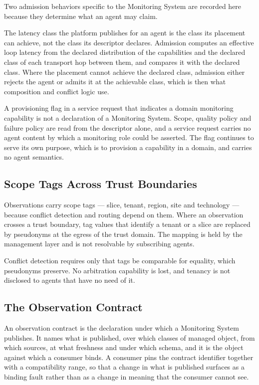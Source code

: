 Two admission behaviors specific to the Monitoring System are recorded
here because they determine what an agent may claim.

The latency class the platform publishes for an agent is the class its
placement can achieve, not the class its descriptor declares. Admission
computes an effective loop latency from the declared distribution of the
capabilities and the declared class of each transport hop between them,
and compares it with the declared class. Where the placement cannot
achieve the declared class, admission either rejects the agent or admits
it at the achievable class, which is then what composition and conflict
logic use.

A provisioning flag in a service request that indicates a domain
monitoring capability is not a declaration of a Monitoring System.
Scope, quality policy and failure policy are read from the descriptor
alone, and a service request carries no agent content by which a
monitoring role could be asserted. The flag continues to serve its own
purpose, which is to provision a capability in a domain, and carries no
agent semantics.

\hypertarget{scope-tags-across-trust-boundaries}{%
\subsection{Scope Tags Across Trust Boundaries}\label{scope-tags-across-trust-boundaries}}

Observations carry scope tags --- slice, tenant, region, site and
technology --- because conflict detection and routing depend on them.
Where an observation crosses a trust boundary, tag values that identify
a tenant or a slice are replaced by pseudonyms at the egress of the
trust domain. The mapping is held by the management layer and is not
resolvable by subscribing agents.

Conflict detection requires only that tags be comparable for equality,
which pseudonyms preserve. No arbitration capability is lost, and
tenancy is not disclosed to agents that have no need of it.

\hypertarget{the-observation-contract}{%
\subsection{The Observation Contract}\label{the-observation-contract}}

An observation contract is the declaration under which a Monitoring
System publishes. It names what is published, over which classes of
managed object, from which sources, at what freshness and under which
schema, and it is the object against which a consumer binds. A consumer
pins the contract identifier together with a compatibility range, so
that a change in what is published surfaces as a binding fault rather
than as a change in meaning that the consumer cannot see.


